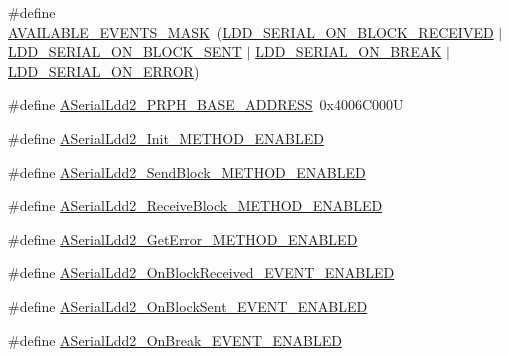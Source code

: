 \begin{DoxyCompactItemize}
\item 
\#define \hyperlink{group___a_serial_ldd2__module_ga5f04a8830cd52a3ffa1678d113f31aee}{A\+V\+A\+I\+L\+A\+B\+L\+E\+\_\+\+E\+V\+E\+N\+T\+S\+\_\+\+M\+A\+SK}~(\hyperlink{group___p_e___types__module_ga1bdfbf78e53d634c2d6c0fac21346a9d}{L\+D\+D\+\_\+\+S\+E\+R\+I\+A\+L\+\_\+\+O\+N\+\_\+\+B\+L\+O\+C\+K\+\_\+\+R\+E\+C\+E\+I\+V\+ED} $\vert$ \hyperlink{group___p_e___types__module_gab32dd0cda62049bd256c1b13d6848ebd}{L\+D\+D\+\_\+\+S\+E\+R\+I\+A\+L\+\_\+\+O\+N\+\_\+\+B\+L\+O\+C\+K\+\_\+\+S\+E\+NT} $\vert$ \hyperlink{group___p_e___types__module_ga5791992a91907e5233a850cd45ea8c21}{L\+D\+D\+\_\+\+S\+E\+R\+I\+A\+L\+\_\+\+O\+N\+\_\+\+B\+R\+E\+AK} $\vert$ \hyperlink{group___p_e___types__module_ga22530c977497afda0f11c86bbf869550}{L\+D\+D\+\_\+\+S\+E\+R\+I\+A\+L\+\_\+\+O\+N\+\_\+\+E\+R\+R\+OR})
\item 
\#define \hyperlink{group___a_serial_ldd2__module_ga0b40933a9f68fae4f6112ed9a6cfd9ef}{A\+Serial\+Ldd2\+\_\+\+P\+R\+P\+H\+\_\+\+B\+A\+S\+E\+\_\+\+A\+D\+D\+R\+E\+SS}~0x4006\+C000U
\item 
\#define \hyperlink{group___a_serial_ldd2__module_ga0733c5676cb9059befd74a42eec355a1}{A\+Serial\+Ldd2\+\_\+\+Init\+\_\+\+M\+E\+T\+H\+O\+D\+\_\+\+E\+N\+A\+B\+L\+ED}
\item 
\#define \hyperlink{group___a_serial_ldd2__module_ga473316fdf4995cf5d1ecac85c658e5ed}{A\+Serial\+Ldd2\+\_\+\+Send\+Block\+\_\+\+M\+E\+T\+H\+O\+D\+\_\+\+E\+N\+A\+B\+L\+ED}
\item 
\#define \hyperlink{group___a_serial_ldd2__module_gada8358a92a4e4793f21bbc76e95ca7cf}{A\+Serial\+Ldd2\+\_\+\+Receive\+Block\+\_\+\+M\+E\+T\+H\+O\+D\+\_\+\+E\+N\+A\+B\+L\+ED}
\item 
\#define \hyperlink{group___a_serial_ldd2__module_gad0d7256dc7800d335b9bb2122ae19459}{A\+Serial\+Ldd2\+\_\+\+Get\+Error\+\_\+\+M\+E\+T\+H\+O\+D\+\_\+\+E\+N\+A\+B\+L\+ED}
\item 
\#define \hyperlink{group___a_serial_ldd2__module_ga1de13d2017cc0ef844acf2c461975589}{A\+Serial\+Ldd2\+\_\+\+On\+Block\+Received\+\_\+\+E\+V\+E\+N\+T\+\_\+\+E\+N\+A\+B\+L\+ED}
\item 
\#define \hyperlink{group___a_serial_ldd2__module_ga7dfcea605c62f020478dd3d4cbf9beb1}{A\+Serial\+Ldd2\+\_\+\+On\+Block\+Sent\+\_\+\+E\+V\+E\+N\+T\+\_\+\+E\+N\+A\+B\+L\+ED}
\item 
\#define \hyperlink{group___a_serial_ldd2__module_ga975445b42dc0a4fc37d8683c75c73287}{A\+Serial\+Ldd2\+\_\+\+On\+Break\+\_\+\+E\+V\+E\+N\+T\+\_\+\+E\+N\+A\+B\+L\+ED}

\end{DoxyCompactItemize}
